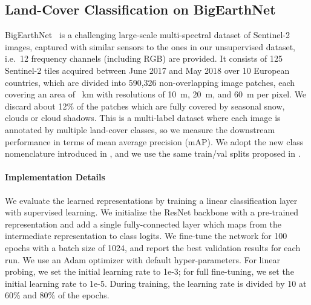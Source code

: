 \documentclass[10pt,twocolumn,letterpaper]{article}
\begin{document}
\subsection{Land-Cover Classification on BigEarthNet}
BigEarthNet~\cite{sumbul2019bigearthnet} is a challenging large-scale multi-spectral dataset of Sentinel-2~\cite{drusch2012sentinel} images, captured with similar sensors to the ones in our unsupervised dataset, i.e.\ 12 frequency channels (including RGB) are provided. It consists of 125 Sentinel-2 tiles acquired between June 2017 and May 2018 over 10 European countries, which are divided into 590,326 non-overlapping image patches, each covering an area of ~km with resolutions of 10~m, 20~m, and 60~m per pixel. We discard about 12\% of the patches which are fully covered by seasonal snow, clouds or cloud shadows. This is a multi-label dataset where each image is annotated by multiple land-cover classes, so we measure the downstream performance in terms of mean average precision (mAP). We adopt the new class nomenclature introduced in \cite{sumbul2020bigearthnet}, and we use the same train/val splits proposed in \cite{neumann2019domain}.

\vspace{-1em}\paragraph{Implementation Details}
We evaluate the learned representations by training a linear classification layer with supervised learning. We initialize the ResNet backbone with a pre-trained representation and add a single fully-connected layer which maps from the intermediate representation to class logits. We fine-tune the network for 100 epochs with a batch size of 1024, and report the best validation results for each run. We use an Adam optimizer with default hyper-parameters. For linear probing, we set the initial learning rate to 1e-3; for full fine-tuning, we set the initial learning rate to 1e-5. During training, the learning rate is divided by 10 at 60\% and 80\% of the epochs.
\end{document}
